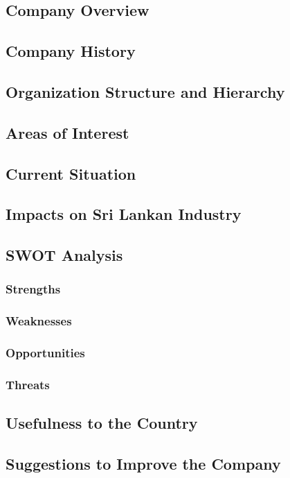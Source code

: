 
\subsection{Company Overview}
\subsection{Company History}
\subsection{Organization Structure and Hierarchy}
\subsection{Areas of Interest}
\subsection{Current Situation}
\subsection{Impacts on Sri Lankan Industry}

\subsection{SWOT Analysis}
\subsubsection{Strengths}
\subsubsection{Weaknesses}
\subsubsection{Opportunities}
\subsubsection{Threats}

\subsection{Usefulness to the Country}
\subsection{Suggestions to Improve the Company}